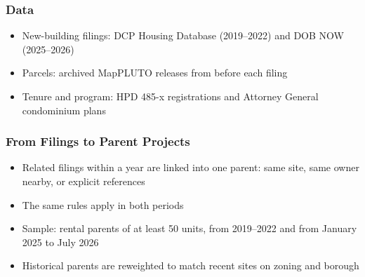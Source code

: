 \begin{frame}
    \frametitle{Data}
    \begin{itemize}[itemsep=0.5em]
        \item New-building filings: DCP Housing Database (2019--2022) and DOB NOW (2025--2026)
        \item Parcels: archived MapPLUTO releases from before each filing
        \item Tenure and program: HPD 485-x registrations and Attorney General condominium plans
    \end{itemize}
\end{frame}

\begin{frame}
    \frametitle{From Filings to Parent Projects}
    \begin{itemize}[itemsep=0.5em]
        \item Related filings within a year are linked into one parent: same site, same owner nearby, or explicit references
        \item The same rules apply in both periods
        \item Sample: rental parents of at least 50 units, \CalibrationHistoricalParents{} from 2019--2022 and \CalibrationPostParents{} from January 2025 to July 2026
        \item Historical parents are reweighted to match recent sites on zoning and borough
    \end{itemize}
\end{frame}
